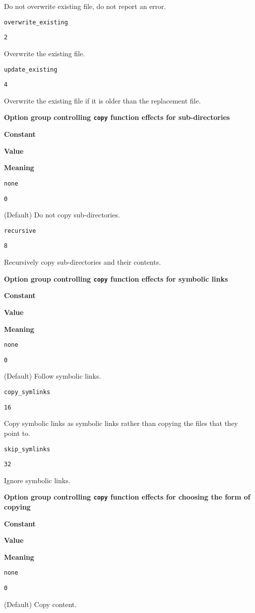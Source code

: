 Do not overwrite existing file, do not report an error.

\texttt{overwrite\_existing}

\texttt{2}

Overwrite the existing file.

\texttt{update\_existing}

\texttt{4}

Overwrite the existing file if it is older than the replacement file.

\textbf{Option group controlling \texttt{copy} function effects for
sub-directories}

\textbf{Constant}

\textbf{Value}

\textbf{Meaning}

\texttt{none}

\texttt{0}

(Default) Do not copy sub-directories.

\texttt{recursive}

\texttt{8}

Recursively copy sub-directories and their contents.

\textbf{Option group controlling \texttt{copy} function effects for
symbolic links}

\textbf{Constant}

\textbf{Value}

\textbf{Meaning}

\texttt{none}

\texttt{0}

(Default) Follow symbolic links.

\texttt{copy\_symlinks}

\texttt{16}

Copy symbolic links as symbolic links rather than copying the files that
they point to.

\texttt{skip\_symlinks}

\texttt{32}

Ignore symbolic links.

\textbf{Option group controlling \texttt{copy} function effects for
choosing the form of copying}

\textbf{Constant}

\textbf{Value}

\textbf{Meaning}

\texttt{none}

\texttt{0}

(Default) Copy content.

